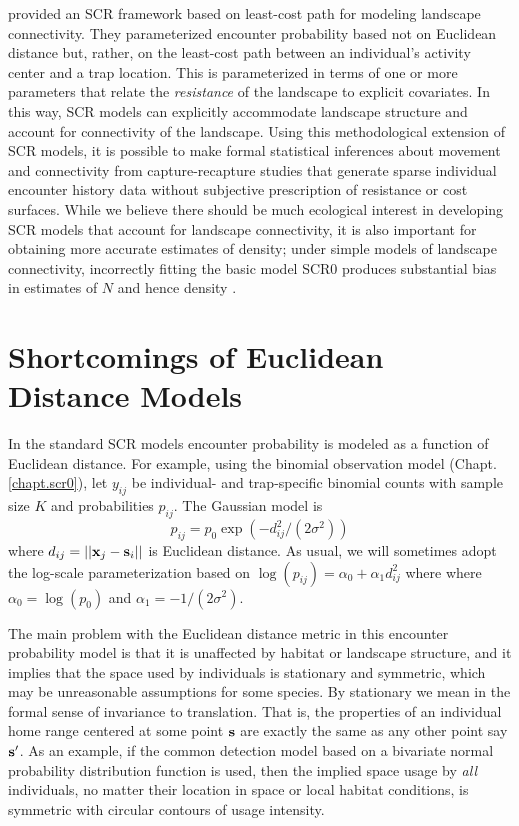 \citet{royle_etal:2012ecol} provided an SCR
framework based on least-cost path for modeling landscape
connectivity. They parameterized encounter
probability 
based not on Euclidean distance but, rather,
on the least-cost path between an individual's activity center and a
trap location. This is parameterized in terms of one or more
parameters that relate the {\it resistance} of the landscape to
explicit covariates.  In this way, SCR models can explicitly accommodate
landscape structure and account for connectivity of the landscape.
Using this
methodological extension of SCR models, it is possible to make formal
statistical inferences about movement and connectivity from
capture-recapture studies that generate sparse individual encounter
history data without subjective prescription of resistance or cost
surfaces. %
While we believe there
should be much ecological interest in developing SCR models that
account for landscape connectivity, it is also important for obtaining
more accurate estimates of density; under simple models of landscape
connectivity, incorrectly fitting the basic model SCR0 produces
substantial bias in estimates of $N$ and hence density  \citep{royle_etal:2012ecol}.


\section{Shortcomings of Euclidean Distance Models}

In the standard SCR models encounter probability is modeled as a
function of Euclidean distance. For example, using the binomial
observation model (Chapt. \ref{chapt.scr0}), let $y_{ij}$ be
individual- and trap-specific binomial counts with sample size $K$ and
probabilities $p_{ij}$. The Gaussian model is
\[
p_{ij} = p_{0} \exp(-  d_{ij}^2 /(2\sigma^{2}) )
\]
where $d_{ij} = ||{\bf x}_{j} - {\bf s}_{i}||$ is Euclidean
distance. As usual, we will sometimes adopt the log-scale
parameterization based on $\log(p_{ij})= \alpha_{0} + \alpha_{1}
d_{ij}^{2}$ where where $\alpha_{0} = \log(p_{0})$ and $\alpha_{1} =
-1/(2\sigma^2)$.

The main problem with the Euclidean distance metric in this encounter
probability model is that it is unaffected by habitat or landscape
structure, and it implies that the space used by individuals is
stationary and symmetric, which may be unreasonable assumptions for
some species. By stationary %
we mean in the formal sense of
invariance to translation. That is, the properties of an individual
home range centered at some point ${\bf s}$ are exactly the same as
any other point say ${\bf s}'$.  As an example, if the common
detection model based on a bivariate normal probability distribution
function is used, then the implied space usage by {\it all}
individuals, no matter their location in space or local habitat
conditions, is symmetric with circular contours of usage intensity.

